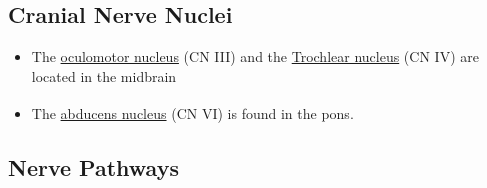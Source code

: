 \documentclass[
  letterpaper,
  DIV=11,
  numbers=noendperiod]{scrartcl}
\providecommand{\tightlist}{%
  \setlength{\itemsep}{0pt}\setlength{\parskip}{0pt}}\usepackage{longtable,booktabs,array}
\begin{document}
\subsection{Cranial Nerve Nuclei}\label{cranial-nerve-nuclei}

\begin{itemize}
\tightlist
\item
  The
  \href{../../../../../../Alchemy\%20Archive/Neuro/Neuroanatomy/Cranial\%20Nerves/Cranial\%20Nerve\%20Nuclei/oculomotor_nucleus.qmd}{oculomotor
  nucleus} (CN III) and the
  \href{../../../../../../Alchemy\%20Archive/Neuro/Neuroanatomy/Cranial\%20Nerves/Cranial\%20Nerve\%20Nuclei/trochlear_nucleus.qmd}{Trochlear
  nucleus} (CN IV) are located in the midbrain
\item
  The
  \href{../../../../../../Alchemy\%20Archive/Neuro/Neuroanatomy/Cranial\%20Nerves/Cranial\%20Nerve\%20Nuclei/abducens_nucleus.qmd}{abducens
  nucleus} (CN VI) is found in the
  pons\textsuperscript{}.
\end{itemize}

\subsection{Nerve Pathways}\label{nerve-pathways}
\end{document}
